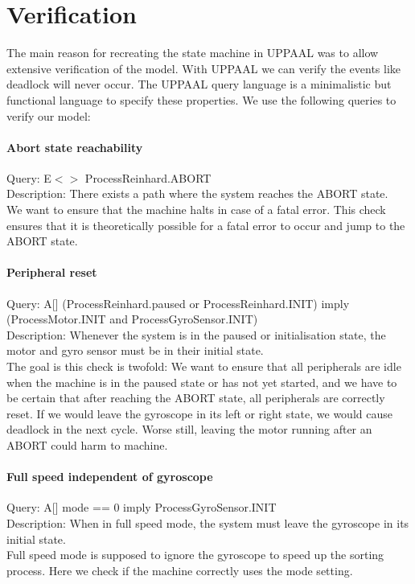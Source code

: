 \documentclass[a4paper,oneside,11pt]{article}
\begin{document}
\section{Verification}
The main reason for recreating the state machine in UPPAAL was to allow extensive verification of the model. With UPPAAL we can verify the events like deadlock will never occur. The UPPAAL query language is a minimalistic but functional language to specify these properties. We use the following queries to verify our model:

\paragraph{Abort state reachability}
Query: E$<>$ ProcessReinhard.ABORT \\
Description: There exists a path where the system reaches the ABORT state.\\
We want to ensure that the machine halts in case of a fatal error. This check ensures that it is theoretically possible for a fatal error to occur and jump to the ABORT state.

\paragraph{Peripheral reset}
Query: A[] (ProcessReinhard.paused or ProcessReinhard.INIT) imply (ProcessMotor.INIT and ProcessGyroSensor.INIT) \\
Description: Whenever the system is in the paused or initialisation state, the motor and gyro sensor must be in their initial state. \\
The goal is this check is twofold: We want to ensure that all peripherals are idle when the machine is in the paused state or has not yet started, and we have to be certain that after reaching the ABORT state, all peripherals are correctly reset. If we would leave the gyroscope in its left or right state, we would cause deadlock in the next cycle. Worse still, leaving the motor running after an ABORT could harm to machine.

\paragraph{Full speed independent of gyroscope}
Query: A[] mode == 0 imply ProcessGyroSensor.INIT \\
Description: When in full speed mode, the system must leave the gyroscope in its initial state. \\
Full speed mode is supposed to ignore the gyroscope to speed up the sorting process. Here we check if the machine correctly uses the mode setting.
\end{document}
